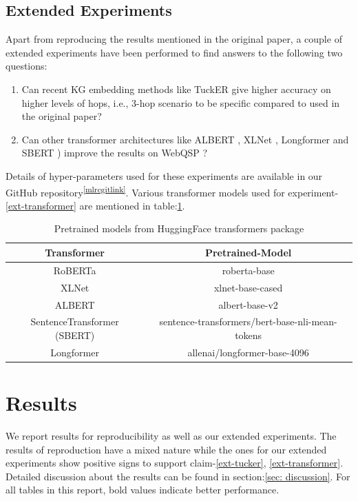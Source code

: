 \subsection{Extended Experiments}
Apart from reproducing the results mentioned in the original paper, a couple of extended experiments have been performed to find answers to the following two questions:
\begin{enumerate}
        \item \label{ext-tucker} Can recent KG embedding methods like TuckER \cite{tucker2019} give higher accuracy on higher levels of hops, i.e., 3-hop scenario to be specific compared to \cite{ComplEx2016} used in the original paper? 
    \item \label{ext-transformer} Can other transformer architectures like ALBERT \cite{albert}, XLNet \cite{xlnet}, Longformer \cite{beltagy2020longformer} and SBERT \cite{reimers-2019-sentence-bert}) improve the results on WebQSP \cite{webqsp-dataset}?
\end{enumerate}

Details of hyper-parameters used for these experiments are available in our GitHub repository\textsuperscript{\ref{mlrcgitlink}}. Various transformer models used for experiment-\ref{ext-transformer} are mentioned in table:\ref{que-emd-pretrained-models}.

\begin{table}[]
\centering
\small
\begin{tabular}{c|c}
\hline
\textbf{Transformer}        & \textbf{Pretrained-Model}                       \\ \hline
RoBERTa                     & roberta-base                                    \\ \hline
XLNet                       & xlnet-base-cased                                \\ \hline
ALBERT                      & albert-base-v2                                  \\ \hline
SentenceTransformer (SBERT) & sentence-transformers/bert-base-nli-mean-tokens \\ \hline
Longformer                  & allenai/longformer-base-4096                    \\ \hline
\end{tabular}
\caption{Pretrained models from HuggingFace transformers package \cite{huggingface-transformers-package-2020}}
\label{que-emd-pretrained-models}
\end{table}

\section{Results}
\label{sec:results}
We report results for reproducibility as well as our extended experiments. The results of reproduction have a mixed nature while the ones for our extended experiments show positive signs to support claim-\ref{ext-tucker}, \ref{ext-transformer}. Detailed discussion about the results can be found in section:\ref{sec: discussion}. For all tables in this report, bold values indicate better performance.

